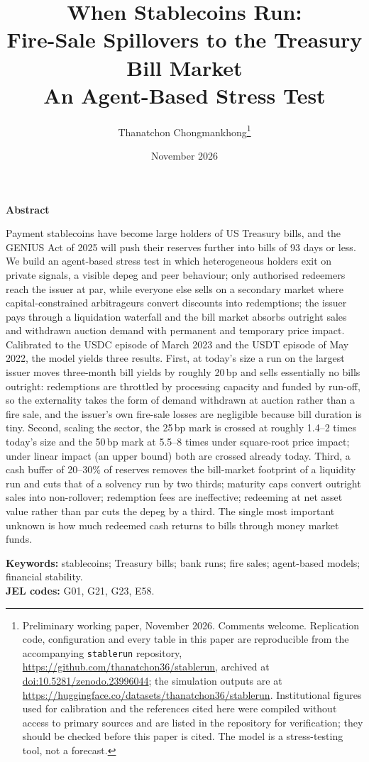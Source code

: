 \documentclass[11pt]{article}
\title{\LARGE\bfseries When Stablecoins Run:\\[0.15em] Fire-Sale Spillovers to the Treasury Bill Market\\[0.6em]
\large\mdseries An Agent-Based Stress Test}
\author{\large Thanatchon Chongmankhong\thanks{Preliminary working paper, November 2026. Comments welcome.
Replication code, configuration and every table in this paper are reproducible from the accompanying
\texttt{stablerun} repository, \url{https://github.com/thanatchon36/stablerun}, archived at
\href{https://doi.org/10.5281/zenodo.23996044}{doi:10.5281/zenodo.23996044}; the simulation outputs are at
\url{https://huggingface.co/datasets/thanatchon36/stablerun}. Institutional figures used for calibration and the references cited here were
compiled without access to primary sources and are listed in the repository for verification; they should be
checked before this paper is cited. The model is a stress-testing tool, not a forecast.}}
\date{\normalsize November 2026}
\begin{document}
\maketitle
\thispagestyle{plain}

\begin{center}
\begin{minipage}{0.9\textwidth}
\small
\begin{center}\textbf{Abstract}\end{center}
\noindent Payment stablecoins have become large holders of US Treasury bills, and the GENIUS Act of 2025 will push
their reserves further into bills of 93 days or less. We build an agent-based stress test in which heterogeneous
holders exit on private signals, a visible depeg and peer behaviour; only authorised redeemers reach the issuer at
par, while everyone else sells on a secondary market where capital-constrained arbitrageurs convert discounts into
redemptions; the issuer pays through a liquidation waterfall and the bill market absorbs outright sales and
withdrawn auction demand with permanent and temporary price impact. Calibrated to the USDC episode of March 2023
and the USDT episode of May 2022, the model yields three results. First, at today's size a run on the largest
issuer moves three-month bill yields by roughly 20\,bp and sells essentially no bills outright: redemptions are
throttled by processing capacity and funded by run-off, so the externality takes the form of demand withdrawn at
auction rather than a fire sale, and the issuer's own fire-sale losses are negligible because bill duration is
tiny. Second, scaling the sector, the 25\,bp mark is crossed at roughly 1.4--2 times today's size and the 50\,bp
mark at 5.5--8 times under square-root price impact; under linear impact (an upper bound) both are crossed
already today. Third, a cash buffer of 20--30\% of reserves removes the bill-market footprint of a liquidity run
and cuts that of a solvency run by two thirds; maturity caps convert outright sales into non-rollover; redemption
fees are ineffective; redeeming at net asset value rather than par cuts the depeg by a third. The single most important
unknown is how much redeemed cash returns to bills through money market funds.

\medskip
\noindent\textbf{Keywords:} stablecoins; Treasury bills; bank runs; fire sales; agent-based models; financial stability.\\
\textbf{JEL codes:} G01, G21, G23, E58.
\end{minipage}
\end{center}
\vspace{0.5em}




\FloatBarrier



\FloatBarrier
\appendix
{}

\end{document}
